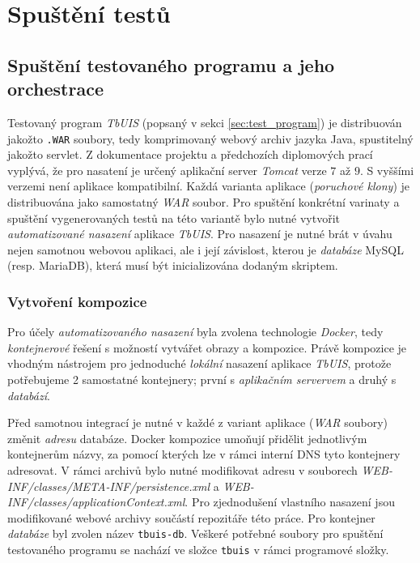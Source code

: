 \documentclass[czech, ma, kiv, he, iso690alph, pdf, viewonly]{fasthesis}
\begin{document}

\chapter{Spuštění testů}

    \section{Spuštění testovaného programu a jeho orchestrace}

    Testovaný program \textit{TbUIS} (popsaný v sekci \ref{sec:test_program}) je distribuován jakožto \verb|.WAR| soubory, tedy komprimovaný webový archiv jazyka Java, spustitelný jakožto \gls{servlet}. Z dokumentace projektu a předchozích diplomových prací vyplývá, že pro nasatení je určený aplikační server \textit{Tomcat} verze \(7\) až \(9\). S vyššími verzemi není aplikace kompatibilní. Každá varianta aplikace (\textit{poruchové klony}) je distribuována jako samostatný \textit{WAR} soubor. Pro spuštění konkrétní varinaty a spuštění vygenerovaných testů na této variantě bylo nutné vytvořit \textit{automatizované nasazení} aplikace \textit{TbUIS}. Pro nasazení je nutné brát v úvahu nejen samotnou webovou aplikaci, ale i její závislost, kterou je \textit{databáze} MySQL (resp. MariaDB), která musí být inicializována dodaným skriptem.

    \subsection{Vytvoření kompozice} \label{sec:composition}
    Pro účely \textit{automatizovaného nasazení} byla zvolena technologie \textit{Docker}, tedy \textit{kontejnerové} řešení s možností vytvářet obrazy a kompozice. Právě kompozice je vhodným nástrojem pro jednoduché \textit{lokální} nasazení aplikace \textit{TbUIS}, protože potřebujeme 2 samostatné kontejnery; první s \textit{aplikačním servervem} a druhý s \textit{databází}.

    Před samotnou integrací je nutné v každé z variant aplikace (\textit{WAR} soubory) změnit \textit{adresu} databáze. Docker kompozice umoňují přidělit jednotlivým kontejnerům názvy, za pomocí kterých lze v rámci interní DNS tyto kontejnery adresovat. V rámci archivů bylo nutné modifikovat adresu v souborech \textit{WEB-INF/classes/META-INF/persistence.xml} a \textit{WEB-INF/classes/applicationContext.xml}. Pro zjednodušení vlastního nasazení jsou modifikované webové archivy součástí repozitáře této práce. Pro kontejner \textit{databáze} byl zvolen název \verb|tbuis-db|. Veškeré potřebné soubory pro spuštění testovaného programu se nachází ve složce \verb|tbuis| v rámci programové složky.
\end{document}
